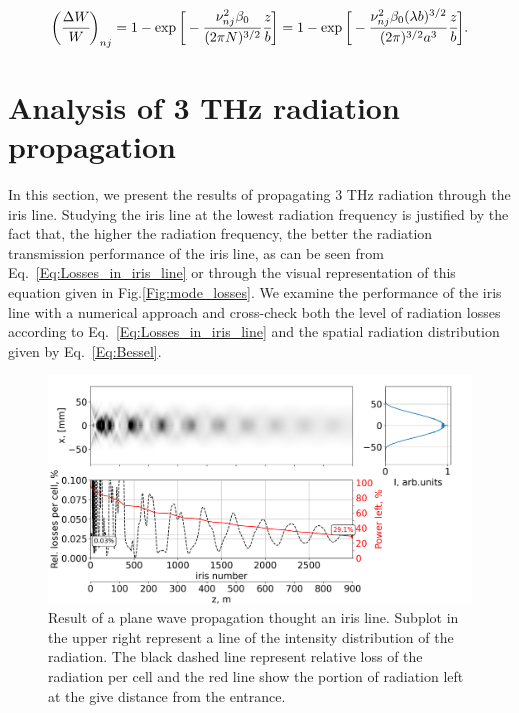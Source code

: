    \begin{align}
        \bigg(\cfrac{\Delta W}{W} \bigg)_{nj} = 1 - \exp{\bigg[ -\frac{\nu^2_{nj}\beta_0}{(2 \pi N)^{3/2}} \cfrac{z}{b} \bigg]} = 1 - \exp{\bigg[ -\frac{\nu^2_{nj}\beta_0 (\lambda b)^{3/2}}{(2 \pi)^{3/2} a^3} \cfrac{z}{b} \bigg]}.
        \label{Eq:Losses_in_iris_line}
    \end{align}
    

\section{Analysis of 3 THz radiation propagation}
    
    In this section, we present the results of propagating $3$ THz radiation through the iris line. Studying the iris line at the lowest radiation frequency is justified by the fact that, the higher the radiation frequency, the better the radiation transmission performance of the iris line, as can be seen from Eq.~\ref{Eq:Losses_in_iris_line} or through the visual representation of this equation given in Fig.\ref{Fig:mode_losses}. We examine the performance of the iris line with a numerical approach and cross-check both the level of radiation losses according to Eq.~\ref{Eq:Losses_in_iris_line} and the spatial radiation distribution given by Eq.~\ref{Eq:Bessel}. 
    
    \begin{figure}[h!]
    	\centering
    		\includegraphics[trim={0 0cm 0 0cm}, width=0.99\linewidth]{content/images/transport/plane_wave.png}
    		\centering
            \captionsetup{justification=centering}
        	\caption{Result of a plane wave propagation thought an iris line. Subplot in the upper right represent a line of the intensity distribution of the radiation. The black dashed line represent relative loss of the radiation per cell and the red line show the portion of radiation left at the give distance from the entrance.}
        \label{Fig:plane_wave}
    \end{figure}
    
